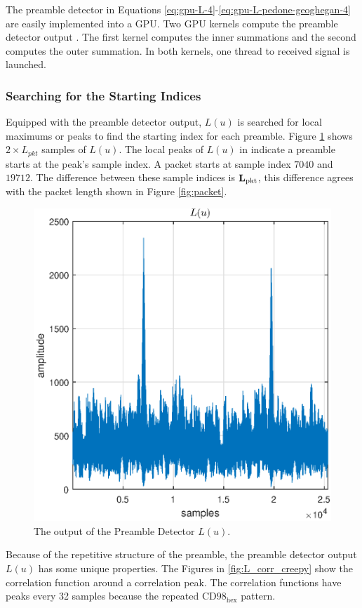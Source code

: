 The preamble detector in Equations \eqref{eq:gpu-L-4}-\eqref{eq:gpu-L-pedone-geoghegan-4} are easily implemented into a GPU.
Two GPU kernels compute the preamble detector output .
The first kernel computes the inner summations and the second computes the outer summation.
In both kernels, one thread to received signal is launched.

\subsubsection{Searching for the Starting Indices}
Equipped with the preamble detector output, $L(u)$ is searched for local maximums or peaks to find the starting index for each preamble.
Figure \ref{fig:L_2_packets} shows $2\times L_{pkt} $ samples of $L(u)$.
The local peaks of $L(u)$ in indicate a preamble starts at the peak's sample index.
A packet starts at sample index $7040$ and $19712$.
The difference between these sample indices is $\mathbf{L}_\text{pkt}$, this difference agrees with the packet length shown in Figure \ref{fig:packet}.
\begin{figure}
	\centering\includegraphics[width=5in]{figures/gpu/L_2_packets.eps}
	\caption{The output of the Preamble Detector $L(u)$.}
	\label{fig:L_2_packets}
\end{figure}

Because of the repetitive structure of the preamble, the preamble detector output $L(u)$ has some unique properties.
The Figures in \ref{fig:L_corr_creepy} show the correlation function around a correlation peak.
The correlation functions have peaks every 32 samples because the repeated $\text{CD98}_\text{hex}$ pattern.

